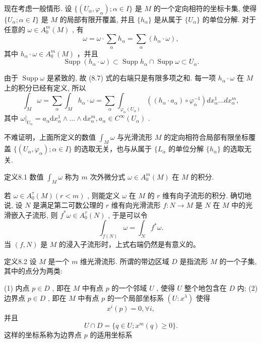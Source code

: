 现在考虑一般情形. 设  $\{(U_{\alpha}, \varphi_{\alpha}); \alpha \in I\}$  是  $M$  的一个定向相符的坐标卡集, 使得  $\{U_{\alpha}; \alpha \in I\}$  是  $M$  的局部有限开覆盖, 并且  $\{h_{\alpha}\}$  是从属于  $\{U_{\alpha}\}$  的单位分解. 对于任意的  $\omega \in A_0^m(M)$ , 有
$$
\omega = \omega \cdot \sum_ {\alpha} h _ {\alpha} = \sum_ {\alpha} \left(h _ {\alpha} \cdot \omega\right), %
$$
其中  $h_\alpha \cdot \omega \in A_0^m (M)$  ，并且
$$
\operatorname {S u p p} \left(h _ {\alpha} \cdot \omega\right) \subset \operatorname {S u p p} h _ {\alpha} \cap \operatorname {S u p p} \omega \subset U _ {\alpha}.
$$

由于  $\operatorname{Supp}\omega$  是紧致的, 故 (8.7) 式的右端只是有限多项之和. 每一项  $h_{\alpha} \cdot \omega$  在  $M$  上的积分已经有定义, 所以
$$
\int_ {M} \omega = \sum_ {\alpha} \int_ {M} h _ {\alpha} \cdot \omega = \sum_ {\alpha} \int_ {\varphi_ {\alpha} (U _ {\alpha})} ((h _ {\alpha} \cdot a _ {\alpha}) \circ \varphi_ {\alpha} ^ {- 1}) d x _ {\alpha} ^ {1} \dots d x _ {\alpha} ^ {m}, %
$$
其中  $\omega|_{U_\alpha} = a_\alpha \mathrm{d}x_\alpha^1 \wedge \dots \wedge \mathrm{d}x_\alpha^m, a_\alpha \in C^\infty(U_\alpha)$ .

不难证明，上面所定义的数值  $\int_{M}\omega$  与光滑流形  $M$  的定向相符合局部有限坐标覆盖  $\{(U_{\alpha},\varphi_{\alpha});\alpha \in I\}$  的选取无关，也与从属于  $\{L_{\alpha}$  的单位分解  $\{h_\alpha \}$  的选取无关.

定义8.1 数值  $\int_{M} \omega$  称为  $m$  次外微分式  $\omega \in A_0^m(M)$  在  $M$  的积分.

若  $\omega \in A_0^\tau (M)(r < m)$ , 则能定义  $\omega$  在  $M$  的  $r$  维有向子流形的积分. 确切地说, 设  $N$  是满足第二可数公理的  $r$  维有向光滑流形  $f: N \to M$  是  $N$  在  $M$  中的光滑嵌入子流形, 则  $f^*\omega \in A_0^\tau (N)$ , 于是可以令
$$
\int_ {f (N)} \omega = \int_ {N} f ^ {*} \omega . %
$$
当  $(f, N)$  是  $M$  的浸入子流形时，上式右端仍然是有意义的。

定义8.2 设  $M$  是一个  $m$  维光滑流形. 所谓的带边区域  $D$  是指流形  $M$  的一个子集, 其中的点分为两类:

(1) 内点  $p \in D$ , 即在  $M$  中有点  $p$  的一个邻域  $U$ , 使得  $U$  整个地包含在  $D$  内;  
(2) 边界点  $p \in D$ , 即在  $M$  中有点  $p$  的一个局部坐标系  $(U: x^{\lambda})$  使得
$$
x ^ {i} (p) = 0, \forall i,
$$
并且
$$
U \cap D = \{q \in U; x ^ {m} (q) \geqslant 0 \}. %
$$
这样的坐标系称为边界点  $p$  的适用坐标系

